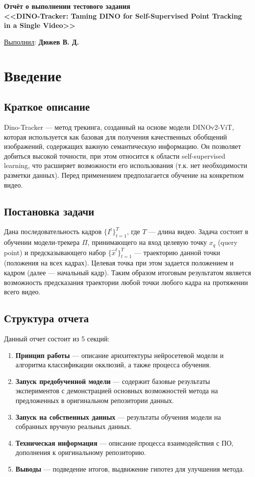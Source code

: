 \documentclass[a4paper, 14pt]{extarticle}
\theoremstyle{definition}
\theoremstyle{plain}
\theoremstyle{remark}
\newcommand*{\titlePage}{
	\thispagestyle{title}
	\begingroup
	\begin{center}
		\vspace*{3ex}
		{\small
		}
		
		\vspace*{2ex}
		
		{\normalsize
		}
		
		\vspace*{30ex}
		
		{\Large \bfseries 
			Отчёт о выполнении тестового задания\\
			{\large <<DINO-Tracker: Taming DINO for Self-Supervised
			Point Tracking in a Single Video>>\\
				}
			
		}
		
	\end{center}
	\vspace*{10ex}
	\begin{flushright}
		{\large 
			\underline{Выполнил}: \textbf{Дюжев В. Д.}
		}

	\end{flushright}	
	\newpage
	\setcounter{page}{1}
	\endgroup}
\begin{document}
\renewcommand{\contentsname}{\hfillОГЛАВЛЕНИЕ\hfill} 
\titlePage
\thispagestyle{plain}
\tableofcontents
\pagestyle{style}

\newpage
\setcounter{page}{1}


\section{Введение}
\subsection{Краткое описание}
Dino-Tracker --- метод трекинга, созданный на основе модели DINOv2-ViT, которая используется как базовая для получения качественных обобщений изображений, содержащих важную семантическую информацию. Он позволяет добиться высокой точности, при этом относится к области self-supervised learning, что расширяет возможности его использования (т.к. нет необходимости разметки данных). Перед применением предполагается обучение на конкретном видео.

\subsection{Постановка задачи}
Дана последовательность кадров $\{I^t\}^T_{t=1}$, где $T$ --- длина видео. Задача состоит в обучении модели-трекера $\Pi$, принимающего на вход целевую точку $x_q$ (query point) и предсказывающего набор $\{\hat{x}^t\}^T_{t=1}$ --- траекторию данной точки (положения на всех кадрах). Целевая точка при этом задается положением и кадром (далее --- начальный кадр).
Таким образом итоговым результатом является возможность предсказания траектории любой точки любого кадра на протяжении всего видео.

\subsection{Структура отчета}
Данный отчет состоит из 5 секций:
\begin{enumerate}
	\item \textbf{Принцип работы} --- описание арихитектуры нейросетевой модели и алгоритма классификации окклюзий, а также процесса обучения.
	\item \textbf{Запуск предобученной модели} --- содержит базовые результаты экспериментов с демонстрацией основных возможностей метода на предложенных в оригинальном репозитории данных.
	\item \textbf{Запуск на собственных данных} --- результаты обучения модели на собранных вручную реальных данных.
	\item \textbf{Техническая информация} --- описание процесса взаимодействия с ПО, дополнения к оригинальному репозиторию.
	\item \textbf{Выводы} --- подведение итогов, выдвижение гипотез для улучшения метода.
\end{enumerate}
\end{document}
